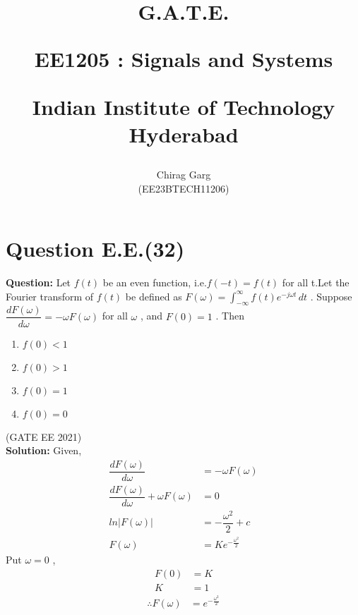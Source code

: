 \documentclass[journal,12pt,twocolumn]{IEEEtran}
\theoremstyle{remark}
\begin{document}
%






\title{
G.A.T.E.

\large{EE1205 : Signals and Systems}

Indian Institute of Technology Hyderabad
}
\author{Chirag Garg

(EE23BTECH11206)
}	





\maketitle

\newpage



\bigskip

\renewcommand{\thefigure}{\theenumi}
\renewcommand{\thetable}{\theenumi}


\section{Question E.E.(32)}
\vspace{0.5cm}



\textbf{Question:} 
Let $f(t)$ be an even function, i.e.$f(-t) = f(t)$ for all t.Let the Fourier transform of $f(t)$ be defined as $F(\omega) = \int_{-\infty}^{\infty} f(t) e^{-j \omega t} \, dt $ . Suppose $\dfrac{dF(\omega)}{d \omega} = -\omega F(\omega)$ for all $\omega$ , and $F(0) = 1$ . Then


\begin{enumerate}[label = (\Alph*)]
\item $f(0) < 1 $\\
\item  $f(0) > 1 $\\
\item  $f(0) = 1 $\\
\item   $f(0) = 0 $\\
\end{enumerate} \hfill{(GATE EE 2021)}\\
\textbf{Solution: }
\fi
Given, \begin{align}
\dfrac{dF(\omega)}{d \omega} &= -\omega F(\omega) \\
\dfrac{dF(\omega)}{d \omega} + \omega F(\omega) &= 0 \\
ln|F(\omega)| &= -\dfrac{\omega^{2}}{2} + c \\
F(\omega) &= Ke^{-\frac{\omega^2}{2}}
\end{align}
Put $\omega = 0$ , \begin{align}
F(0) &= K \\
K&=1
\end{align}
\begin{align}
\therefore F(\omega) &= e^{-\frac{\omega^2}{2}}
\end{align}
\end{document}
